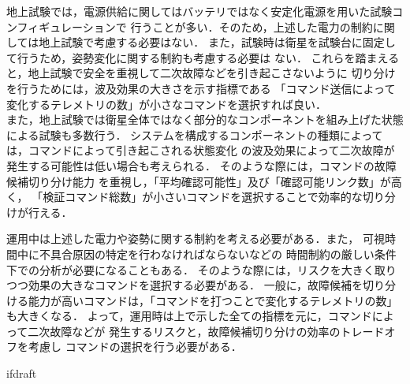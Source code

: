\documentclass[11pt]{jsreport}
\begin{document}
地上試験では，電源供給に関してはバッテリではなく安定化電源を用いた試験コンフィギュレーションで
行うことが多い．そのため，上述した電力の制約に関しては地上試験で考慮する必要はない．
また，試験時は衛星を試験台に固定して行うため，姿勢変化に関する制約も考慮する必要は
ない．
これらを踏まえると，地上試験で安全を重視して二次故障などを引き起こさないように
切り分けを行うためには，波及効果の大きさを示す指標である
「コマンド送信によって変化するテレメトリの数」が小さなコマンドを選択すれば良い．\\
また，地上試験では衛星全体ではなく部分的なコンポーネントを組み上げた状態による試験も多数行う．
システムを構成するコンポーネントの種類によっては，コマンドによって引き起こされる状態変化
の波及効果によって二次故障が発生する可能性は低い場合も考えられる．
そのような際には，コマンドの故障候補切り分け能力
を重視し，「平均確認可能性」及び「確認可能リンク数」が高く，
「検証コマンド総数」が小さいコマンドを選択することで効率的な切り分けが行える．

運用中は上述した電力や姿勢に関する制約を考える必要がある．また，
可視時間中に不具合原因の特定を行わなければならないなどの
時間制約の厳しい条件下での分析が必要になることもある．
そのような際には，リスクを大きく取りつつ効果の大きなコマンドを選択する必要がある．
一般に，故障候補を切り分ける能力が高いコマンドは，「コマンドを打つことで変化するテレメトリの数」
も大きくなる．
よって，運用時は上で示した全ての指標を元に，コマンドによって二次故障などが
発生するリスクと，故障候補切り分けの効率のトレードオフを考慮し
コマンドの選択を行う必要がある．


\expandafter\ifx\csname ifdraft\endcsname\relax
  
\end{document}
